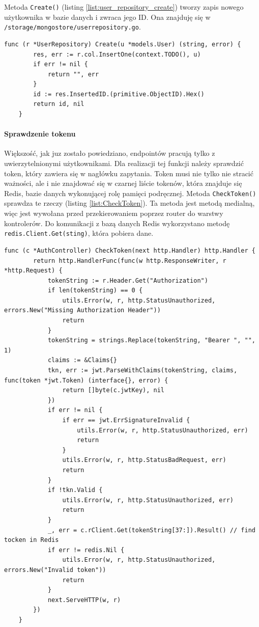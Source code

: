 Metoda \texttt{Create()} (listing \ref{list:user_repository_create}) tworzy zapis nowego użytkownika w bazie danych i zwraca jego ID.
Ona znajduję się w \texttt{/storage/mongostore/userrepository.go}.
\begin{lstlisting}[label=list:user_repository_create,caption=Zachowanie użytkownika do bazy danych.,basicstyle=\tiny\ttfamily]
    func (r *UserRepository) Create(u *models.User) (string, error) {
        res, err := r.col.InsertOne(context.TODO(), u)
        if err != nil {
            return "", err
        }
        id := res.InsertedID.(primitive.ObjectID).Hex()
        return id, nil
    }
\end{lstlisting}

\paragraph{Sprawdzenie tokenu\newline}
Większość, jak juz zostało powiedziano, endpointów pracują tylko z uwierzytelnionymi użytkownikami. Dla realizacji tej funkcji należy sprawdzić token, który zawiera się w nagłówku zapytania.
Token musi nie tylko nie stracić ważności, ale i nie znajdować się w czarnej liście tokenów, która znajduje się Redis, bazie danych wykonującej rolę pamięci podręcznej.
Metoda \texttt{CheckToken()} sprawdza te rzeczy (listing \ref{list:CheckToken}). Ta metoda jest metodą medialną, więc jest wywołana przed przekierowaniem poprzez router do warstwy kontrolerów. Do komunikacji z bazą danych Redis wykorzystano metodę \texttt{redis.Client.Get(sting)}, która pobiera dane.
\begin{lstlisting}[label=list:CheckToken,caption=Walidacja JWT tokena,basicstyle=\tiny\ttfamily]
    func (c *AuthController) CheckToken(next http.Handler) http.Handler {
        return http.HandlerFunc(func(w http.ResponseWriter, r *http.Request) {
            tokenString := r.Header.Get("Authorization")
            if len(tokenString) == 0 {
                utils.Error(w, r, http.StatusUnauthorized, errors.New("Missing Authorization Header"))
                return
            }
            tokenString = strings.Replace(tokenString, "Bearer ", "", 1)
            claims := &Claims{}
            tkn, err := jwt.ParseWithClaims(tokenString, claims, func(token *jwt.Token) (interface{}, error) {
                return []byte(c.jwtKey), nil
            })
            if err != nil {
                if err == jwt.ErrSignatureInvalid {
                    utils.Error(w, r, http.StatusUnauthorized, err)
                    return
                }
                utils.Error(w, r, http.StatusBadRequest, err)
                return
            }
            if !tkn.Valid {
                utils.Error(w, r, http.StatusUnauthorized, err)
                return
            }
            _, err = c.rClient.Get(tokenString[37:]).Result() // find tocken in Redis
            if err != redis.Nil {
                utils.Error(w, r, http.StatusUnauthorized, errors.New("Invalid token"))
                return
            }
            next.ServeHTTP(w, r)
        })
    }
\end{lstlisting}

